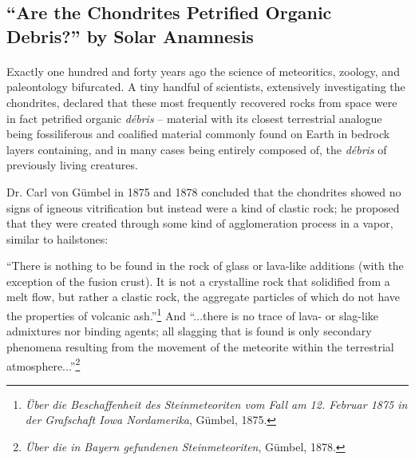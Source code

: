 \documentclass[a4paper, 12pt, oneside]{article}
\begin{document}
\subsection{``Are the Chondrites Petrified Organic Debris?'' by Solar Anamnesis}
\paragraph*{}
Exactly one hundred and forty years ago the science of meteoritics, zoology, and paleontology bifurcated. A tiny handful of scientists, extensively investigating the chondrites, declared that these most frequently recovered rocks from space were in fact petrified organic \emph{débris} -- material with its closest terrestrial analogue being fossiliferous and coalified material commonly found on Earth in bedrock layers containing, and in many cases being entirely composed of, the \emph{débris} of previously living creatures.

Dr. Carl von Gümbel in 1875 and 1878 concluded that the chondrites showed no signs of igneous vitrification but instead were a kind of clastic rock; he proposed that they were created through some kind of agglomeration process in a vapor, similar to hailstones:
\begin{displayquote}
``There is nothing to be found in the rock of glass or lava-like additions (with the exception of the fusion crust). It is not a crystalline rock that solidified from a melt flow, but rather a clastic rock, the aggregate particles of which do not have the properties of volcanic ash.''\footnote{\emph{Über die Beschaffenheit des Steinmeteoriten vom Fall am 12. Februar 1875 in der Grafschaft Iowa Nordamerika}, Gümbel, 1875.} And ``...there is no trace of lava- or slag-like admixtures nor binding agents; all slagging that is found is only secondary phenomena resulting from the movement of the meteorite within the terrestrial atmosphere...''\footnote{\emph{Über die in Bayern gefundenen Steinmeteoriten}, Gümbel, 1878.}
\end{displayquote}
\end{document}
